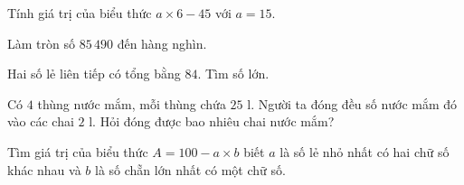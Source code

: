 \begin{ex} %
Tính giá trị của biểu thức $a \times 6 - 45$ với $a = 15$.
\end{ex}

\begin{ex} %
Làm tròn số $85\,490$ đến hàng nghìn.
\end{ex}

\begin{ex} %
Hai số lẻ liên tiếp có tổng bằng $84$. Tìm số lớn.
\end{ex}

\begin{ex} %
Có $4$ thùng nước mắm, mỗi thùng chứa $25\text{ l}$. Người ta đóng đều số nước mắm đó vào các chai $2\text{ l}$. Hỏi đóng được bao nhiêu chai nước mắm?
\end{ex}

\begin{ex} %
Tìm giá trị của biểu thức $A = 100 - a \times b$ biết $a$ là số lẻ nhỏ nhất có hai chữ số khác nhau và $b$ là số chẵn lớn nhất có một chữ số.
\end{ex}
